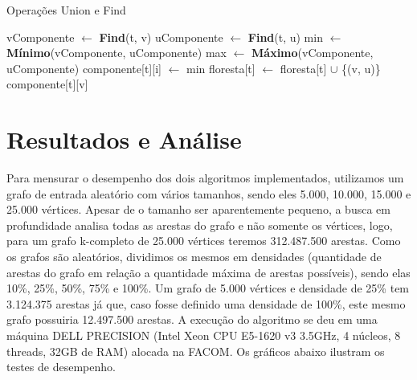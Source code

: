 \documentclass[12pt]{article}
\begin{document}
\begin{algorithm}[h]
    \DontPrintSemicolon
    \caption{Operações Union e Find}
    \label{alg_par2}
    {
        vComponente $\gets$ \textbf{Find}(t, v)\;
        uComponente $\gets$ \textbf{Find}(t, u)\;
        min $\gets$ \textbf{Mínimo}(vComponente, uComponente)\;
		max $\gets$ \textbf{Máximo}(vComponente, uComponente)\;
        {
            {
                {
                    componente[t][i] $\gets$ min\;
                }
            }
            floresta[t] $\gets$ floresta[t] $\cup$ \{(v, u)\}\;
        }
    }
    {
        \Return componente[t][v]\;
    }
\end{algorithm}

\section{Resultados e Análise}

Para mensurar o desempenho dos dois algoritmos implementados, utilizamos um grafo de entrada aleatório com vários tamanhos, sendo eles 5.000, 10.000, 15.000 e 25.000 vértices. Apesar de o tamanho ser aparentemente pequeno, a busca em profundidade analisa todas as arestas do grafo e não somente os vértices, logo, para um grafo k-completo de 25.000 vértices teremos 312.487.500 arestas. Como os grafos são aleatórios, dividimos os mesmos em densidades (quantidade de arestas do grafo em relação a quantidade máxima de arestas possíveis), sendo elas 10\%, 25\%, 50\%, 75\% e 100\%. Um grafo de 5.000 vértices e densidade de 25\% tem 3.124.375 arestas já que, caso fosse definido uma densidade de 100\%, este mesmo grafo possuiria 12.497.500 arestas.
A execução do algoritmo se deu em uma máquina DELL PRECISION (Intel Xeon CPU E5-1620 v3 3.5GHz, 4 núcleos, 8 threads, 32GB de RAM) alocada na FACOM. Os gráficos abaixo ilustram os testes de desempenho.
\end{document}
